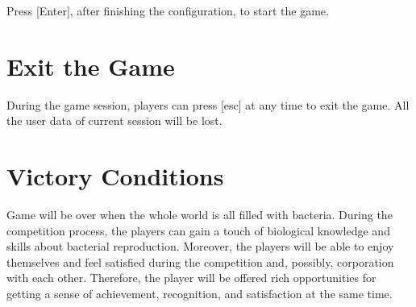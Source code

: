 \documentclass[12pt,a4paper,twoside]{scrartcl}
\begin{document}
Press [Enter], after finishing the configuration, to start the game.
\section{Exit the Game}
During the game session, players can press [esc] at any time to exit the game. All the user data of current session will be lost.

\section{Victory Conditions}
Game will be over when the whole world is all filled with bacteria. During the competition process, the players can gain a touch of biological knowledge and skills about bacterial reproduction. Moreover, the players will be able to enjoy themselves and feel satisfied during the competition and, possibly, corporation with each other. Therefore, the player will be offered rich opportunities for getting a sense of achievement, recognition, and satisfaction at the same time.
\end{document}
